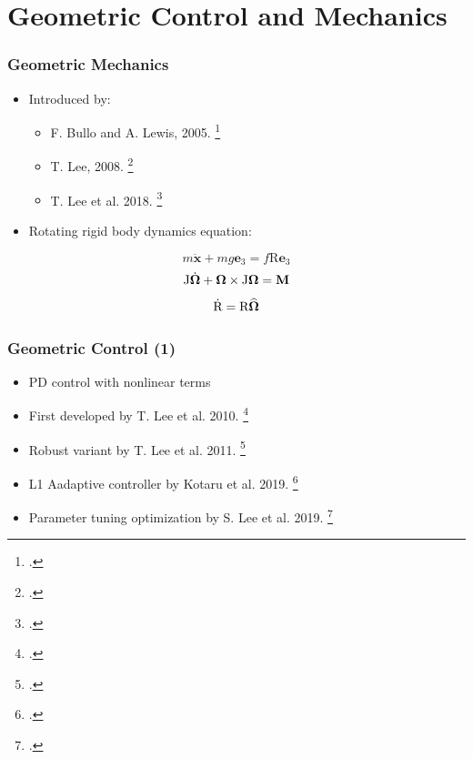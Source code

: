 \section{Geometric Control and Mechanics}

\begin{frame}
	\frametitle{Geometric Mechanics}
	
	\begin{itemize}
		\item Introduced by:
		\begin{itemize}
			\item F. Bullo and A. Lewis, 2005. \footcite{bulloBook}
			\item T. Lee, 2008. \footcite{Lee2008ComputationalGM}
			\item T. Lee et al. 2018. \footcite{LeeModel} 
		\end{itemize}
	
	\end{itemize}
	\begin{itemize}
		\item Rotating rigid body dynamics equation:
	\end{itemize}	
	\begin{equation}
		m \ddot{\textbf{x}} + m g\textbf{e}_3 = f\text{R}\textbf{e}_3 \label{model1}
	\end{equation}
	\begin{equation}
		\text{J}\dot{\boldsymbol{\Omega}} + \boldsymbol{\Omega} \times \text{J}\boldsymbol{\Omega} = \textbf{M} \label{model2}
	\end{equation}
	\begin{equation}                       
		\dot{\text{R}} = \text{R}\widehat{\boldsymbol{\Omega}} \label{model3}
	\end{equation}
	
\end{frame}

\begin{frame}
	\frametitle{Geometric Control (1)}

	\begin{itemize}
		\item PD control with nonlinear terms
		\item First developed by T. Lee et al. 2010. \footcite{LeeClanak4}
		\item Robust variant by T. Lee et al. 2011. \footcite{LeeClanak3}
		\item L1 Aadaptive controller by Kotaru et al. 2019. \footcite{Kotaru2019GeometricLA}
		\item Parameter tuning optimization by S. Lee et al. 2019. \footcite{Lee2019}
	\end{itemize}
\end{frame}

